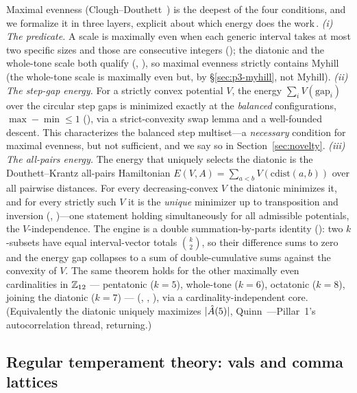 Maximal evenness (Clough--Douthett~\cite{CloughDouthett}) is the deepest of the four conditions, and
we formalize it in three layers, explicit about which energy does the work\,.
\emph{(i) The predicate.} A scale is maximally even when each generic interval takes at most two
specific sizes and those are consecutive integers (); the diatonic and the
whole-tone scale both qualify (, ), so maximal
evenness strictly contains Myhill (the whole-tone scale is maximally even but, by
\S\ref{sec:p3-myhill}, not Myhill). \emph{(ii) The step-gap energy.} For a strictly convex potential
$V$, the energy $\sum_i V(\text{gap}_i)$ over the circular step gaps is minimized exactly at the
\emph{balanced} configurations, $\max-\min\le1$ (), via a
strict-convexity swap lemma and a well-founded descent. This characterizes the balanced step
multiset---a \emph{necessary} condition for maximal evenness, but not sufficient, and we say so in
Section~\ref{sec:novelty}. \emph{(iii) The all-pairs energy.} The energy that uniquely selects the
diatonic is the Douthett--Krantz all-pairs Hamiltonian $E(V,A)=\sum_{a<b}V(\mathrm{cdist}(a,b))$
over all pairwise distances. For every decreasing-convex $V$ the diatonic minimizes it, and for
every strictly such $V$ it is the \emph{unique} minimizer up to transposition and inversion
(, )---one statement holding simultaneously for
all admissible potentials, the $V$-independence. The engine is a double summation-by-parts identity
(): two $k$-subsets have equal interval-vector totals $\binom{k}{2}$, so their
difference sums to zero and the energy gap collapses to a sum of double-cumulative sums against the
convexity of $V$. The same theorem holds for the other maximally even
cardinalities in $\mathbb{Z}_{12}$ --- pentatonic ($k=5$), whole-tone ($k=6$), octatonic ($k=8$), joining
the diatonic ($k=7$) --- (, ,
), via a cardinality-independent core. (Equivalently the diatonic uniquely maximizes $|\hat{A}(5)|$,
Quinn~\cite{Quinn}---Pillar~1's autocorrelation thread, returning.)

\subsection{Regular temperament theory: vals and comma lattices}\label{sec:p3-rtt}

